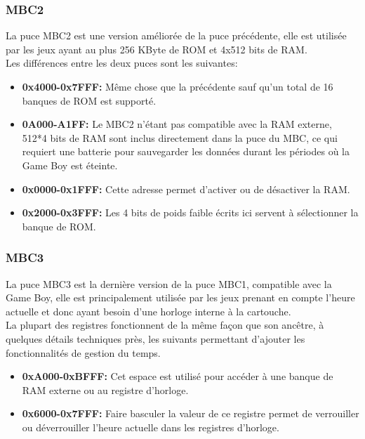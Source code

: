 \documentclass{report}
\begin{document}
\subsubsection{MBC2}
	La puce MBC2 est une version améliorée de la puce précédente, elle est utilisée par les jeux ayant au plus 256 KByte de ROM et 4x512 bits de RAM.
\\Les différences entre les deux puces sont les suivantes:\\
\begin{itemize}
\item \textbf{0x4000-0x7FFF:} Même chose que la précédente sauf qu'un total de 16 banques de ROM est supporté.\\
\item \textbf{0A000-A1FF:} Le MBC2 n'étant pas compatible avec la RAM externe, 512*4 bits de RAM sont inclus directement dans la puce du MBC, ce qui requiert une batterie pour sauvegarder les données durant les périodes où la Game Boy est éteinte.\\
\item \textbf{0x0000-0x1FFF:} Cette adresse permet d'activer ou de désactiver la RAM.\\
\item \textbf{0x2000-0x3FFF:} Les 4 bits de poids faible écrits ici servent à sélectionner la banque de ROM.\\
\end{itemize}
\subsubsection{MBC3}
	La puce MBC3 est la dernière version de la puce MBC1, compatible avec la Game Boy, elle est principalement utilisée par les jeux prenant en compte l'heure actuelle et donc ayant besoin d'une horloge interne à la cartouche.\\
La plupart des registres fonctionnent de la même façon que son ancêtre, à quelques détails techniques près, les suivants permettant d'ajouter les fonctionnalités de gestion du temps.
\begin{itemize}
\item \textbf{0xA000-0xBFFF:} Cet espace est utilisé pour accéder à une banque de RAM externe ou au registre d'horloge.\\
\item \textbf{0x6000-0x7FFF:} Faire basculer la valeur de ce registre permet de verrouiller ou déverrouiller l'heure actuelle dans les registres d'horloge.\\ 
\end{itemize}
\end{document}

